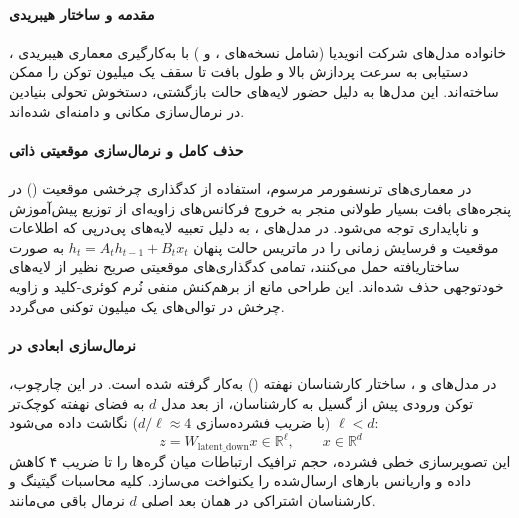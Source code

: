 \item {}

\paragraph*{مقدمه و ساختار هیبریدی }
خانواده مدل‌های  شرکت انویدیا \cite{nvidia2025nemotron3} (شامل نسخه‌های ،  و ) با به‌کارگیری معماری هیبریدی ، دستیابی به سرعت پردازش بالا و طول بافت تا سقف یک میلیون توکن را ممکن ساخته‌اند. این مدل‌ها به دلیل حضور لایه‌های حالت بازگشتی، دستخوش تحولی بنیادین در نرمال‌سازی مکانی و دامنه‌ای شده‌اند.

\paragraph*{حذف کامل  و نرمال‌سازی موقعیتی ذاتی}
در معماری‌های ترنسفورمر مرسوم، استفاده از کدگذاری چرخشی موقعیت () در پنجره‌های بافت بسیار طولانی منجر به خروج فرکانس‌های زاویه‌ای از توزیع پیش‌آموزش و ناپایداری توجه می‌شود. در مدل‌های ، به دلیل تعبیه لایه‌های پی‌درپی  \cite{vaswani2017attention} که اطلاعات موقعیت و فرسایش زمانی را در ماتریس حالت پنهان $h_t = A_t h_{t-1} + B_t x_t$ به صورت ساختاریافته حمل می‌کنند، تمامی کدگذاری‌های موقعیتی صریح نظیر  از لایه‌های خودتوجهی حذف شده‌اند. این طراحی مانع از برهم‌کنش منفی نُرم کوئری-کلید و زاویه چرخش در توالی‌های یک میلیون توکنی می‌گردد.

\paragraph*{نرمال‌سازی ابعادی در }
در مدل‌های  و ، ساختار کارشناسان نهفته () به‌کار گرفته شده است. در این چارچوب، توکن ورودی پیش از گسیل به کارشناسان، از بعد مدل $d$ به فضای نهفته کوچک‌تر $\ell < d$ (با ضریب فشرده‌سازی $d/\ell \approx 4$) نگاشت داده می‌شود:
\begin{equation}
    z = W_{\text{latent\_down}} x \in \mathbb{R}^\ell, \qquad x \in \mathbb{R}^d
\end{equation}
این تصویرسازی خطی فشرده، حجم ترافیک ارتباطات  میان گره‌ها را تا ضریب ۴ کاهش داده و واریانس بارهای ارسال‌شده را یکنواخت می‌سازد. کلیه محاسبات گیتینگ و کارشناسان اشتراکی در همان بعد اصلی $d$ نرمال باقی می‌مانند.

